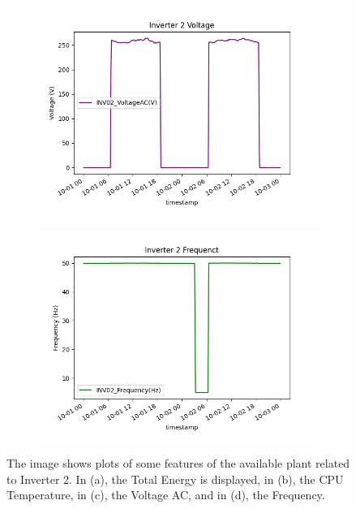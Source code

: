 \begin{figure}[H]
	\begin{subfigure}[t]{0.45\textwidth}
		\centering
		\includegraphics[width=\textwidth, keepaspectratio]{chapters/1_introduction/imgs/inv2voltage.png}
		\caption{}
		\label{fig:inv02volt}
	\end{subfigure}
	\hspace{0.5cm}
	\begin{subfigure}[t]{0.45\textwidth}
		\centering
		\includegraphics[width=\textwidth, keepaspectratio]{chapters/1_introduction/imgs/inv2freq.png}
		\caption{}
		\label{fig:inv02freq}
	\end{subfigure}
	\caption{The image shows plots of some features of the available plant related to Inverter 2. In (a), the Total Energy is displayed, in (b), the CPU Temperature, in (c), the Voltage AC, and in (d), the Frequency.}
\end{figure}


